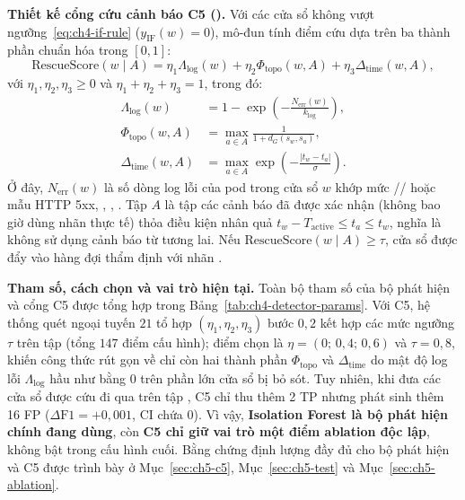 \textbf{Thiết kế cổng cứu cảnh báo C5 ().} Với các cửa sổ không vượt ngưỡng~\eqref{eq:ch4-if-rule} ($y_{\text{IF}}(w) = 0$), mô-đun  tính điểm cứu dựa trên ba thành phần chuẩn hóa trong $[0, 1]$:
\begin{equation}
  \text{RescueScore}(w \mid A) = \eta_1 \Lambda_{\text{log}}(w) + \eta_2 \Phi_{\text{topo}}(w, A) + \eta_3 \Delta_{\text{time}}(w, A),
  \label{eq:ch4-rescue}
\end{equation}
với $\eta_1, \eta_2, \eta_3 \ge 0$ và $\eta_1 + \eta_2 + \eta_3 = 1$, trong đó:
\begin{align}
  \Lambda_{\text{log}}(w) &= 1 - \exp\!\left(-\frac{N_{\text{err}}(w)}{k_{\text{log}}}\right), \label{eq:ch4-rescue-log} \\
  \Phi_{\text{topo}}(w, A) &= \max_{a \in A} \frac{1}{1 + d_G(s_w, s_a)}, \label{eq:ch4-rescue-topo} \\
  \Delta_{\text{time}}(w, A) &= \max_{a \in A} \exp\!\left(-\frac{|t_w - t_a|}{\sigma}\right). \label{eq:ch4-rescue-time}
\end{align}
Ở đây, $N_{\text{err}}(w)$ là số dòng log lỗi của pod trong cửa sổ $w$ khớp mức // hoặc mẫu HTTP 5xx, , , . Tập $A$ là tập các cảnh báo đã được \CTAV{} xác nhận (không bao giờ dùng nhãn thực tế) thỏa điều kiện nhân quả $t_w - T_{\text{active}} \le t_a \le t_w$, nghĩa là không sử dụng cảnh báo từ tương lai. Nếu $\text{RescueScore}(w \mid A) \ge \tau$, cửa sổ được đẩy vào hàng đợi thẩm định với nhãn .

\textbf{Tham số, cách chọn và vai trò hiện tại.} Toàn bộ tham số của bộ phát hiện và cổng C5 được tổng hợp trong Bảng~\ref{tab:ch4-detector-params}. Với C5, hệ thống quét ngoại tuyến $21$ tổ hợp $(\eta_1, \eta_2, \eta_3)$ bước $0{,}2$ kết hợp các mức ngưỡng $\tau$ trên tập  (tổng $147$ điểm cấu hình); điểm chọn là $\eta = (0;\, 0{,}4;\, 0{,}6)$ và $\tau = 0{,}8$, khiến công thức rút gọn về chỉ còn hai thành phần $\Phi_{\text{topo}}$ và $\Delta_{\text{time}}$ do mật độ log lỗi $\Lambda_{\text{log}}$ hầu như bằng $0$ trên phần lớn cửa sổ bị bỏ sót. Tuy nhiên, khi đưa các cửa sổ được cứu đi qua \CTAV{} trên tập , C5 chỉ thu thêm 2 TP nhưng phát sinh thêm 16 FP ($\Delta\text{F1} = +0{,}001$, CI chứa 0). Vì vậy, \textbf{Isolation Forest là bộ phát hiện chính đang dùng}, còn \textbf{C5 chỉ giữ vai trò một điểm ablation độc lập}, không bật trong cấu hình \CTAV{} cuối. Bằng chứng định lượng đầy đủ cho bộ phát hiện và C5 được trình bày ở Mục~\ref{sec:ch5-c5}, Mục~\ref{sec:ch5-test} và Mục~\ref{sec:ch5-ablation}.


